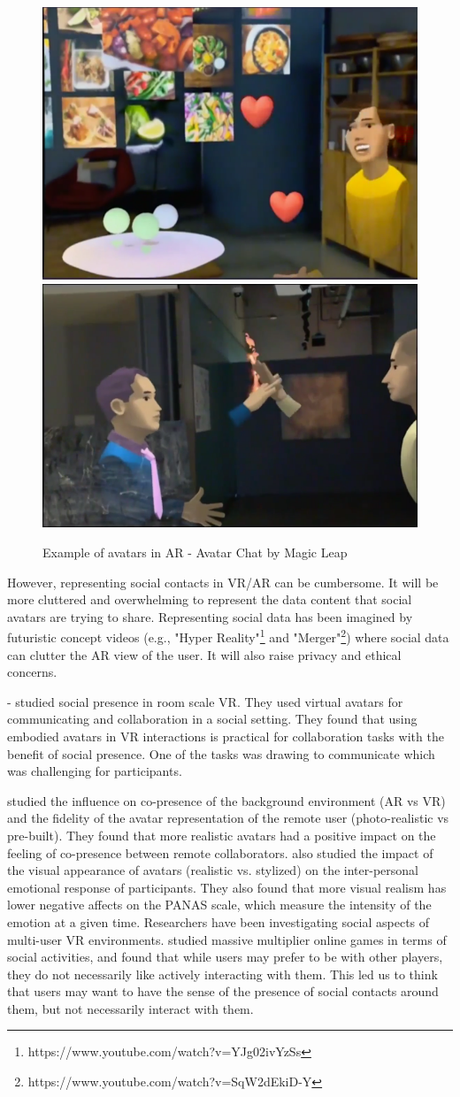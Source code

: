 \begin{figure}
    \centering
    \includegraphics[width=.4\linewidth]{images/avatar-chat-1.png}
    \includegraphics[width=.4\linewidth]{images/avatar-chat-2.png}
    \caption{Example of avatars in AR - Avatar Chat by Magic Leap}
    \label{fig:ml-avatar-chat}
\end{figure}

However, representing social contacts in VR/AR can be cumbersome. It will be more cluttered and overwhelming to represent the data content that social avatars are trying to share. Representing social data has been imagined by futuristic concept videos (e.g., "Hyper Reality"\footnote{https://www.youtube.com/watch?v=YJg02ivYzSs} and "Merger"\footnote{https://www.youtube.com/watch?v=SqW2dEkiD-Y}) where social data can clutter the AR view of the user. It will also raise privacy and ethical concerns.

\cite{Greenwald2017} - studied social presence in room scale VR. They used virtual avatars for communicating and collaboration in a social setting. They found that using embodied avatars in VR interactions is practical for collaboration tasks with the benefit of social presence. One of the tasks was drawing to communicate which was challenging for participants. 

\cite{Jo2016} studied the influence on co-presence of the background environment (AR vs VR) and the fidelity of the avatar representation of the remote user (photo-realistic vs pre-built). They found that more realistic avatars had a positive impact on the feeling of co-presence between remote collaborators. \cite{Volante2016} also studied the impact of the visual appearance of avatars (realistic vs. stylized) on the inter-personal emotional response of participants. They also found that more visual realism has lower negative affects on the PANAS scale, which measure the intensity of the emotion at a given time. Researchers have been investigating social aspects of multi-user VR environments. \cite{Ducheneaut2006} studied massive multiplier online games in terms of social activities, and found that while users may prefer to be with other players, they do not necessarily like actively interacting with them. This led us to think that users may want to have the sense of the presence of social contacts around them, but not necessarily interact with them.

